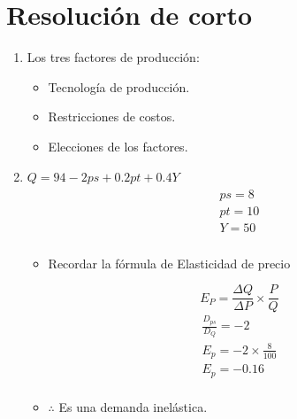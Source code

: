 \section{Resolución de corto}
\begin{enumerate}
    
    \item Los tres factores de producción:
        \begin{itemize}
            \item Tecnología de producción. 
            \item Restricciones de costos.
            \item Elecciones de los factores.
        \end{itemize}
    
    \item $Q = 94-2ps+0.2pt+0.4Y$
        \begin{align*}
            \begin{matrix}
                ps=8 \\ 
                pt=10 \\ 
                Y=50 \\ 
            \end{matrix}
        \end{align*}
        \begin{itemize}
            \item Recordar la fórmula de Elasticidad de precio
        \end{itemize}
        \[
            E_P = \frac{\Delta Q}{\Delta P} \times \frac{P}{Q} 
        \]
        \begin{align*}
            \frac{D_{ps}}{D_Q} = -2 \\ 
            E_p = -2 \times \frac{8}{100}  \\ 
            E_p = -0.16 \\ 
        \end{align*}
        \begin{itemize}
            \item $\therefore $ Es una demanda inelástica.
        \end{itemize}
    

\end{enumerate}
